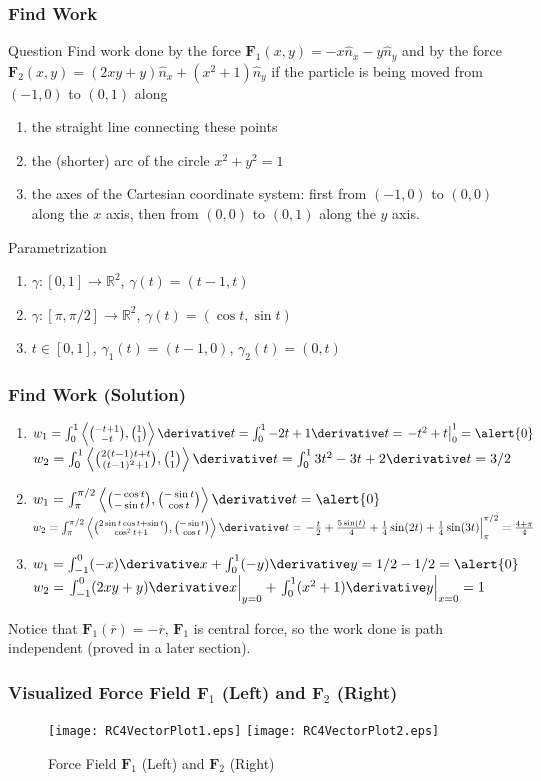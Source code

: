 \begin{frame}
\frametitle{Find Work}
\begin{block}{Question}
Find work done by the force $\mathbf{F}_1(x,y)=-x\hat{n}_x-y\hat{n}_y$ and by the force $\mathbf{F}_2(x,y)=(2xy+y)\hat{n}_x+(x^2+1)\hat{n}_y$ if the particle is being moved from $(-1,0)$ to $(0,1)$ along
\begin{enumerate}
\item{the straight line connecting these points}
\item{the (shorter) arc of the circle $x^2+y^2=1$}
\item{the axes of the Cartesian coordinate system: first from $(-1,0)$ to $(0,0)$ along the $x$ axis, then from $(0,0)$ to $(0,1)$ along the $y$ axis.}
\end{enumerate}
\end{block}
\begin{block}{Parametrization}
\begin{enumerate}
\item{$\gamma: [0,1]\to \mathbb{R}^2$, $\gamma(t)=(t-1,t)$}
\item{$\gamma: [\pi,\pi/2]\to\mathbb{R}^2$, $\gamma(t)=(\cos t,\sin t)$}
\item{$t\in [0,1]$, $\gamma_1(t)=(t-1,0)$, $\gamma_2(t)=(0,t)$}
\end{enumerate}
\end{block}
\end{frame}
\begin{frame}
\frametitle{Find Work (Solution)}
\begin{enumerate}
\item{$w_1=\int_0^1\left<\binom{-t+1}{-t},\binom{1}{1}\right>\derivative t=\int_0^1 -2t+1\derivative t=\left.-t^2+t\right|_0^1=\alert{0}$
$w_2=\int_0^1\left<\binom{2(t-1)t+t}{(t-1)^2+1},\binom{1}{1}\right>\derivative t=\int_0^13t^2-3t+2\derivative t=3/2$}
\item{$w_1=\int_\pi^{\pi/2}\left<\binom{-\cos t}{-\sin t},\binom{-\sin t}{\cos t}\right>\derivative t=\alert{0}$ $w_2=\int_\pi^{\pi/2}\left<\binom{2\sin t\cos t+\sin t}{\cos^2 t+1},\binom{-\sin t}{\cos t}\right>\derivative t=\left.-\frac{t}{2}+\frac{5 \sin (t)}{4}+\frac{1}{4} \sin (2 t)+\frac{1}{4} \sin (3 t)\right|_\pi^{\pi/2}=\frac{4+\pi}{4}$}
\item{$w_1=\int_{-1}^{0}(-x)\derivative x+\int_0^1(-y)\derivative y=1/2-1/2=\alert{0}$ $w_2=\left.\int_{-1}^0(2xy+y)\derivative x\right|_{y=0}+\left.\int_{0}^{1}(x^2+1)\derivative y\right|_{x=0}=1$}
\end{enumerate}
Notice that $\mathbf{F}_1(\overline{r})=-\overline{r}$, $\mathbf{F}_1$ is central force, so the work done is \alert{path independent} (proved in a later section).
\end{frame}
\begin{frame}
\frametitle{Visualized Force Field $\mathbf{F}_1$ (Left) and $\mathbf{F}_2$ (Right)}
\begin{figure}
\centering
\texttt{[image: RC4VectorPlot1.eps]}
\texttt{[image: RC4VectorPlot2.eps]}
\caption{Force Field $\mathbf{F}_1$ (Left) and $\mathbf{F}_2$ (Right)}
\end{figure}
\end{frame}
